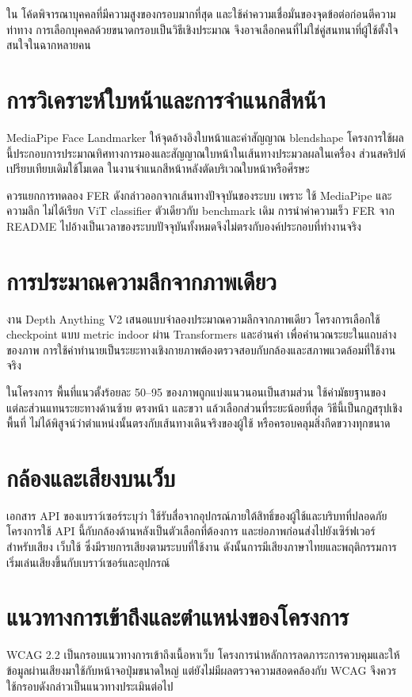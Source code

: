 ใน  โค้ดพิจารณาบุคคลที่มีความสูงของกรอบมากที่สุด และใช้ค่าความเชื่อมั่นของจุดข้อต่อก่อนตีความท่าทาง การเลือกบุคคลด้วยขนาดกรอบเป็นวิธีเชิงประมาณ จึงอาจเลือกคนที่ไม่ใช่คู่สนทนาที่ผู้ใช้ตั้งใจสนใจในฉากหลายคน

\section{การวิเคราะห์ใบหน้าและการจำแนกสีหน้า}
MediaPipe Face Landmarker ให้จุดอ้างอิงใบหน้าและค่าสัญญาณ blendshape \cite{mediapipe} โครงการใช้ผลนี้ประกอบการประมาณทิศทางการมองและสัญญาณใบหน้าในเส้นทางประมวลผลในเครื่อง ส่วนสคริปต์เปรียบเทียบเดิมใช้โมเดล  \cite{fer} ในงานจำแนกสีหน้าหลังตัดบริเวณใบหน้าหรือศีรษะ

ควรแยกการทดลอง FER ดังกล่าวออกจากเส้นทางปัจจุบันของระบบ เพราะ  ใช้ MediaPipe และความลึก ไม่ได้เรียก ViT classifier ตัวเดียวกับ benchmark เดิม การนำค่าความเร็ว FER จาก README ไปอ้างเป็นเวลาของระบบปัจจุบันทั้งหมดจึงไม่ตรงกับองค์ประกอบที่ทำงานจริง

\section{การประมาณความลึกจากภาพเดียว}
งาน Depth Anything V2 เสนอแบบจำลองประมาณความลึกจากภาพเดียว \cite{depth} โครงการเลือกใช้ checkpoint แบบ metric indoor ผ่าน Transformers และอ่านค่า  เพื่อคำนวณระยะในแถบล่างของภาพ การใช้ค่าทำนายเป็นระยะทางเชิงกายภาพต้องตรวจสอบกับกล้องและสภาพแวดล้อมที่ใช้งานจริง

ในโครงการ พื้นที่แนวตั้งร้อยละ 50--95 ของภาพถูกแบ่งแนวนอนเป็นสามส่วน ใช้ค่ามัธยฐานของแต่ละส่วนแทนระยะทางด้านซ้าย ตรงหน้า และขวา แล้วเลือกส่วนที่ระยะน้อยที่สุด วิธีนี้เป็นกฎสรุปเชิงพื้นที่ ไม่ได้พิสูจน์ว่าตำแหน่งนั้นตรงกับเส้นทางเดินจริงของผู้ใช้ หรือครอบคลุมสิ่งกีดขวางทุกขนาด

\section{กล้องและเสียงบนเว็บ}
เอกสาร API ของเบราว์เซอร์ระบุว่า  ใช้รับสื่อจากอุปกรณ์ภายใต้สิทธิ์ของผู้ใช้และบริบทที่ปลอดภัย \cite{camera} โครงการใช้ API นี้กับกล้องด้านหลังเป็นตัวเลือกที่ต้องการ และย่อภาพก่อนส่งไปยังเซิร์ฟเวอร์ สำหรับเสียง เว็บใช้  ซึ่งมีรายการเสียงตามระบบที่ใช้งาน \cite{speech} ดังนั้นการมีเสียงภาษาไทยและพฤติกรรมการเริ่มเล่นเสียงขึ้นกับเบราว์เซอร์และอุปกรณ์

\section{แนวทางการเข้าถึงและตำแหน่งของโครงการ}
WCAG 2.2 เป็นกรอบแนวทางการเข้าถึงเนื้อหาเว็บ \cite{wcag} โครงการนำหลักการลดภาระการควบคุมและให้ข้อมูลผ่านเสียงมาใช้กับหน้าจอปุ่มขนาดใหญ่ แต่ยังไม่มีผลตรวจความสอดคล้องกับ WCAG จึงควรใช้กรอบดังกล่าวเป็นแนวทางประเมินต่อไป

